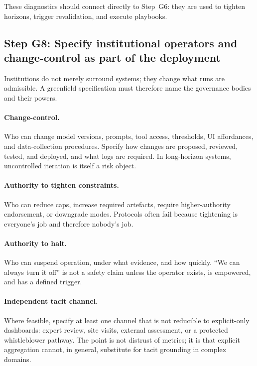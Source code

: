 These diagnostics should connect directly to Step~G6: they are used to tighten horizons, trigger revalidation, and execute playbooks.

\subsection{Step G8: Specify institutional operators and change-control as part of the deployment}

Institutions do not merely surround systems; they change what runs are admissible. A greenfield specification must therefore name the governance bodies and their powers.

\paragraph{Change-control.}
Who can change model versions, prompts, tool access, thresholds, UI affordances, and data-collection procedures. Specify how changes are proposed, reviewed, tested, and deployed, and what logs are required. In long-horizon systems, uncontrolled iteration is itself a risk object.

\paragraph{Authority to tighten constraints.}
Who can reduce caps, increase required artefacts, require higher-authority endorsement, or downgrade modes. Protocols often fail because tightening is everyone’s job and therefore nobody’s job.

\paragraph{Authority to halt.}
Who can suspend operation, under what evidence, and how quickly. ``We can always turn it off'' is not a safety claim unless the operator exists, is empowered, and has a defined trigger.

\paragraph{Independent tacit channel.}
Where feasible, specify at least one channel that is not reducible to explicit-only dashboards: expert review, site visits, external assessment, or a protected whistleblower pathway. The point is not distrust of metrics; it is that explicit aggregation cannot, in general, substitute for tacit grounding in complex domains.

